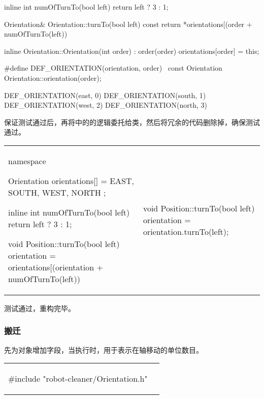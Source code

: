 \begin{content}
\begin{leftbar}
\begin{c++}[caption={src/robot-cleaner/Orientation.cpp}]
{    inline int numOfTurnTo(bool left)
    { return left ? 3 : 1; }
}

Orientation& Orientation::turnTo(bool left) const
{
    return *orientations[(order + numOfTurnTo(left)) %
}

inline Orientation::Orientation(int order)
  : order(order)
{
    orientations[order] = this;
}

#define DEF_ORIENTATION(orientation, order) \
const Orientation Orientation::orientation(order);

DEF_ORIENTATION(east,  0)
DEF_ORIENTATION(south, 1)
DEF_ORIENTATION(west,  2)
DEF_ORIENTATION(north, 3)
\end{c++}
\end{leftbar}

保证测试通过后，再将中的的逻辑委托给类，然后将冗余的代码删除掉，确保测试通过。

\begin{tabular}{@{}p{} 
                 | p{\dimexpr0.45\linewidth-\tabcolsep}@{}}
\begin{c++}[caption={src/robot-cleaner/Position.cpp}]
namespace
{
    Orientation orientations[] = { EAST, SOUTH, WEST, NORTH };
    
    inline int numOfTurnTo(bool left)
    { return left ? 3 : 1; }
}

void Position::turnTo(bool left)
{
    orientation = orientations[(orientation + numOfTurnTo(left)) %
}
\end{c++}
&
\begin{c++}[caption={src/robot-cleaner/Position.cpp}]
void Position::turnTo(bool left)
{
    orientation = orientation.turnTo(left);
}
\end{c++}
\end{tabular}

测试通过，重构完毕。

\subsubsection{搬迁}

先为对象增加字段，当执行时，用于表示在轴移动的单位数目。

\begin{tabular}{@{}p{} 
                 | p{\dimexpr0.45\linewidth-\tabcolsep}@{}}
\begin{c++}[caption={src/robot-cleaner/Orientation.cpp}]
#include "robot-cleaner/Orientation.h"


\end{c++}
\end{tabular}
\end{content}
